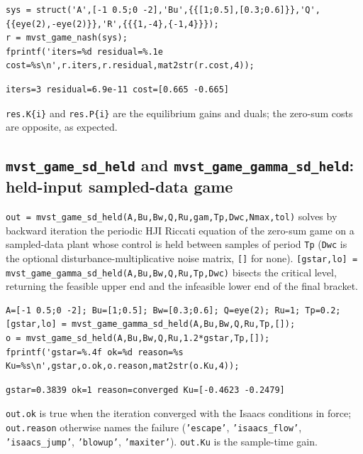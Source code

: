 \documentclass[11pt,oneside]{report}
\newcommand{\code}[1]{\texttt{#1}}
\begin{document}
\begin{lstlisting}[style=matlabstyle]
sys = struct('A',[-1 0.5;0 -2],'Bu',{{[1;0.5],[0.3;0.6]}},'Q',{{eye(2),-eye(2)}},'R',{{{1,-4},{-1,4}}});
r = mvst_game_nash(sys);
fprintf('iters=%d residual=%.1e cost=%s\n',r.iters,r.residual,mat2str(r.cost,4));
\end{lstlisting}

\begin{lstlisting}[style=outputstyle]
iters=3 residual=6.9e-11 cost=[0.665 -0.665]
\end{lstlisting}

\code{res.K\{i\}} and \code{res.P\{i\}} are the equilibrium gains and duals; the zero-sum
costs are opposite, as expected.

\hypertarget{mvst_game_sd_held-and-mvst_game_gamma_sd_held-held-input-sampled-data-game}{%
\subsection{\texorpdfstring{\code{mvst\_game\_sd\_held} and \code{mvst\_game\_gamma\_sd\_held}: held-input sampled-data game}{mvst\_game\_sd\_held and mvst\_game\_gamma\_sd\_held: held-input sampled-data game}}\label{mvst_game_sd_held-and-mvst_game_gamma_sd_held-held-input-sampled-data-game}}

\code{out = mvst\_game\_sd\_held(A,Bu,Bw,Q,Ru,gam,Tp,Dwc,Nmax,tol)} solves by backward
iteration the periodic HJI Riccati equation of the zero-sum game on a
sampled-data plant whose control is held between samples of period \code{Tp}
(\code{Dwc} is the optional disturbance-multiplicative noise matrix, \code{[]} for none).
\code{[gstar,lo] = mvst\_game\_gamma\_sd\_held(A,Bu,Bw,Q,Ru,Tp,Dwc)} bisects the
critical level, returning the feasible upper end and the infeasible lower end of
the final bracket.

\begin{lstlisting}[style=matlabstyle]
A=[-1 0.5;0 -2]; Bu=[1;0.5]; Bw=[0.3;0.6]; Q=eye(2); Ru=1; Tp=0.2;
[gstar,lo] = mvst_game_gamma_sd_held(A,Bu,Bw,Q,Ru,Tp,[]);
o = mvst_game_sd_held(A,Bu,Bw,Q,Ru,1.2*gstar,Tp,[]);
fprintf('gstar=%.4f ok=%d reason=%s Ku=%s\n',gstar,o.ok,o.reason,mat2str(o.Ku,4));
\end{lstlisting}

\begin{lstlisting}[style=outputstyle]
gstar=0.3839 ok=1 reason=converged Ku=[-0.4623 -0.2479]
\end{lstlisting}

\code{out.ok} is true when the iteration converged with the Isaacs conditions in
force; \code{out.reason} otherwise names the failure (\code{'escape'}, \code{'isaacs\_flow'},
\code{'isaacs\_jump'}, \code{'blowup'}, \code{'maxiter'}). \code{out.Ku} is the sample-time gain.
\end{document}
